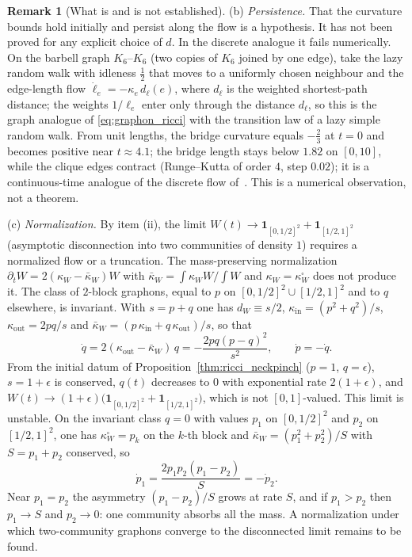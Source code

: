 \documentclass[11pt,a4paper,reqno]{amsart}
\theoremstyle{definition}
\newtheorem{remark}[theorem]{Remark}
\numberwithin{equation}{section}
\begin{document}
\begin{remark}[What is and is not established]
(b) \emph{Persistence.} That the curvature bounds hold initially and persist along the flow is a hypothesis. It has not been proved for any explicit choice of $d$. In the discrete analogue it fails numerically. On the barbell graph $K_6$--$K_6$ (two copies of $K_6$ joined by one edge), take the lazy random walk with idleness $\tfrac12$ that moves to a uniformly chosen neighbour and the edge-length flow $\dot\ell_e = -\kappa_e\,d_\ell(e)$, where $d_\ell$ is the weighted shortest-path distance; the weights $1/\ell_e$ enter only through the distance $d_\ell$, so this is the graph analogue of \eqref{eq:graphon_ricci} with the transition law of a lazy simple random walk. From unit lengths, the bridge curvature equals $-\tfrac23$ at $t=0$ and becomes positive near $t\approx4.1$; the bridge length stays below $1.82$ on $[0,10]$, while the clique edges contract (Runge--Kutta of order $4$, step $0.02$); it is a continuous-time analogue of the discrete flow of~\cite{ni2019community}. This is a numerical observation, not a theorem.

(c) \emph{Normalization.} By item (ii), the limit $W(t) \to \mathbf{1}_{[0,1/2]^2} + \mathbf{1}_{[1/2,1]^2}$ (asymptotic disconnection into two communities of density $1$) requires a normalized flow or a truncation. The mass-preserving normalization $\partial_t W = 2(\kappa_W - \bar\kappa_W)W$ with $\bar\kappa_W = \int\kappa_W W/\int W$ and $\kappa_W=\kappa^{\square}_W$ does not produce it. The class of $2$-block graphons, equal to $p$ on $[0,1/2]^2\cup[1/2,1]^2$ and to $q$ elsewhere, is invariant. With $s = p+q$ one has $d_W\equiv s/2$, $\kappa_{\mathrm{in}} = (p^2+q^2)/s$, $\kappa_{\mathrm{out}} = 2pq/s$ and $\bar\kappa_W = (p\,\kappa_{\mathrm{in}}+q\,\kappa_{\mathrm{out}})/s$, so that
\begin{equation*}
    \dot q = 2(\kappa_{\mathrm{out}}-\bar\kappa_W)\,q = -\frac{2pq(p-q)^2}{s^2}, \qquad \dot p = -\dot q.
\end{equation*}
From the initial datum of Proposition~\ref{thm:ricci_neckpinch} ($p=1$, $q=\epsilon$), $s = 1+\epsilon$ is conserved, $q(t)$ decreases to $0$ with exponential rate $2(1+\epsilon)$, and $W(t)\to(1+\epsilon)\big(\mathbf{1}_{[0,1/2]^2}+\mathbf{1}_{[1/2,1]^2}\big)$, which is not $[0,1]$-valued. This limit is unstable. On the invariant class $q=0$ with values $p_1$ on $[0,1/2]^2$ and $p_2$ on $[1/2,1]^2$, one has $\kappa^{\square}_W = p_k$ on the $k$-th block and $\bar\kappa_W = (p_1^2+p_2^2)/S$ with $S = p_1+p_2$ conserved, so
\begin{equation*}
    \dot p_1 = \frac{2p_1p_2(p_1-p_2)}{S} = -\dot p_2 .
\end{equation*}
Near $p_1=p_2$ the asymmetry $(p_1-p_2)/S$ grows at rate $S$, and if $p_1>p_2$ then $p_1\to S$ and $p_2\to0$: one community absorbs all the mass. A normalization under which two-community graphons converge to the disconnected limit remains to be found.
\end{remark}
\end{document}
